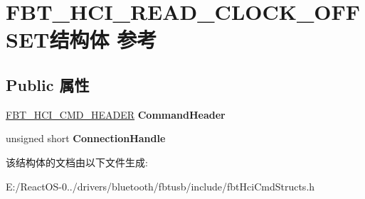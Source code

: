 \hypertarget{struct_f_b_t___h_c_i___r_e_a_d___c_l_o_c_k___o_f_f_s_e_t}{}\section{F\+B\+T\+\_\+\+H\+C\+I\+\_\+\+R\+E\+A\+D\+\_\+\+C\+L\+O\+C\+K\+\_\+\+O\+F\+F\+S\+E\+T结构体 参考}
\label{struct_f_b_t___h_c_i___r_e_a_d___c_l_o_c_k___o_f_f_s_e_t}
\subsection*{Public 属性}
\begin{DoxyCompactItemize}
\item 
\mbox{\label{struct_f_b_t___h_c_i___r_e_a_d___c_l_o_c_k___o_f_f_s_e_t_a137e638d5f09fcf9776fe044deeeb25f}} 
\hyperlink{struct_f_b_t___h_c_i___c_m_d___h_e_a_d_e_r}{F\+B\+T\+\_\+\+H\+C\+I\+\_\+\+C\+M\+D\+\_\+\+H\+E\+A\+D\+ER} {\bfseries Command\+Header}
\item 
\mbox{\label{struct_f_b_t___h_c_i___r_e_a_d___c_l_o_c_k___o_f_f_s_e_t_a12fd27c12eeb2af6434313b5fa8fcb82}} 
unsigned short {\bfseries Connection\+Handle}
\end{DoxyCompactItemize}


该结构体的文档由以下文件生成\+:\begin{DoxyCompactItemize}
\item 
E\+:/\+React\+O\+S-\/0../drivers/bluetooth/fbtusb/include/fbt\+Hci\+Cmd\+Structs.\+h\end{DoxyCompactItemize}
